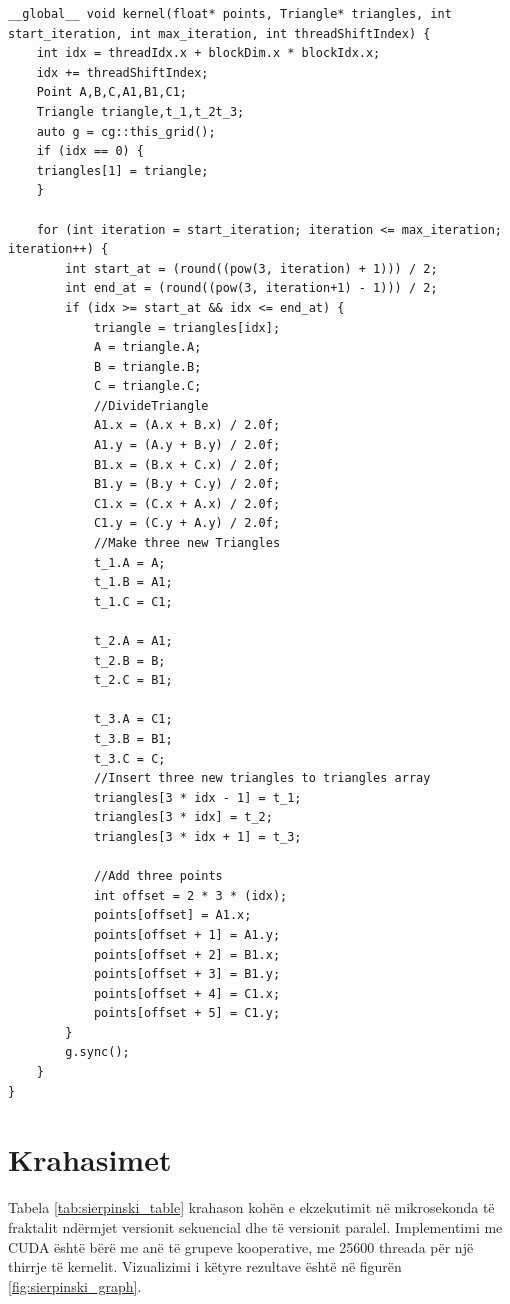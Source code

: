 \begin{lstlisting}
__global__ void kernel(float* points, Triangle* triangles, int start_iteration, int max_iteration, int threadShiftIndex) {
    int idx = threadIdx.x + blockDim.x * blockIdx.x;
    idx += threadShiftIndex;
    Point A,B,C,A1,B1,C1;
    Triangle triangle,t_1,t_2t_3;
    auto g = cg::this_grid();
    if (idx == 0) {
    triangles[1] = triangle;
    }
    
    for (int iteration = start_iteration; iteration <= max_iteration; iteration++) {
        int start_at = (round((pow(3, iteration) + 1))) / 2;
        int end_at = (round((pow(3, iteration+1) - 1))) / 2;
        if (idx >= start_at && idx <= end_at) {
            triangle = triangles[idx];
            A = triangle.A;
            B = triangle.B;
            C = triangle.C;
            //DivideTriangle 
            A1.x = (A.x + B.x) / 2.0f;
            A1.y = (A.y + B.y) / 2.0f;
            B1.x = (B.x + C.x) / 2.0f;
            B1.y = (B.y + C.y) / 2.0f;
            C1.x = (C.x + A.x) / 2.0f;
            C1.y = (C.y + A.y) / 2.0f;
            //Make three new Triangles
            t_1.A = A;
            t_1.B = A1;
            t_1.C = C1;
            
            t_2.A = A1;
            t_2.B = B;
            t_2.C = B1;
            
            t_3.A = C1;
            t_3.B = B1;
            t_3.C = C;
            //Insert three new triangles to triangles array
            triangles[3 * idx - 1] = t_1;
            triangles[3 * idx] = t_2;
            triangles[3 * idx + 1] = t_3;
            
            //Add three points 
            int offset = 2 * 3 * (idx);
            points[offset] = A1.x;
            points[offset + 1] = A1.y;
            points[offset + 2] = B1.x;
            points[offset + 3] = B1.y;
            points[offset + 4] = C1.x;
            points[offset + 5] = C1.y;
        }
        g.sync();
    }
}

\end{lstlisting}


\section{Krahasimet}

Tabela \ref{tab:sierpinski_table} krahason kohën e ekzekutimit në mikrosekonda të fraktalit ndërmjet versionit sekuencial dhe të versionit paralel. Implementimi me CUDA është bërë me  anë të grupeve kooperative, me 25600 threada për një thirrje të kernelit. Vizualizimi i këtyre rezultave është në figurën \ref{fig:sierpinski_graph}.

